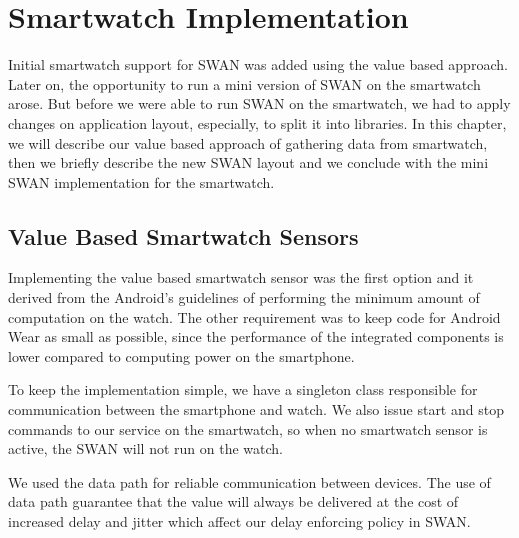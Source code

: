 
\chapter{Smartwatch Implementation} %

\label{Chapter5} %


Initial smartwatch support for SWAN was added using the value based approach. Later on, the opportunity to run a mini version of SWAN on the smartwatch arose. But before we were able to 
run SWAN on the smartwatch, we had to apply changes on application layout, especially, to split it into libraries. In this chapter, we will describe our value based approach of gathering data from
smartwatch, then we briefly describe the new SWAN layout and we conclude with the mini SWAN implementation for the smartwatch.

\section{ Value Based Smartwatch Sensors }
Implementing the value based smartwatch sensor was the first option and it derived from the Android's guidelines of performing the minimum amount of computation on the watch.
The other requirement was to keep code for Android Wear as small as possible, since the performance of the integrated components is lower compared to computing power on the smartphone.

To keep the implementation simple, we have a singleton class  responsible for communication between the smartphone and watch. We also issue start and stop commands to our service on the smartwatch,
so when no smartwatch sensor is active, the SWAN will not run on the watch.

We used the data path \cite{android_wear_datapath} for reliable communication between devices. The use of data path guarantee that the value will always be delivered at the cost of increased delay
and jitter\cite{jitter_ref} which affect our delay enforcing policy in SWAN.

